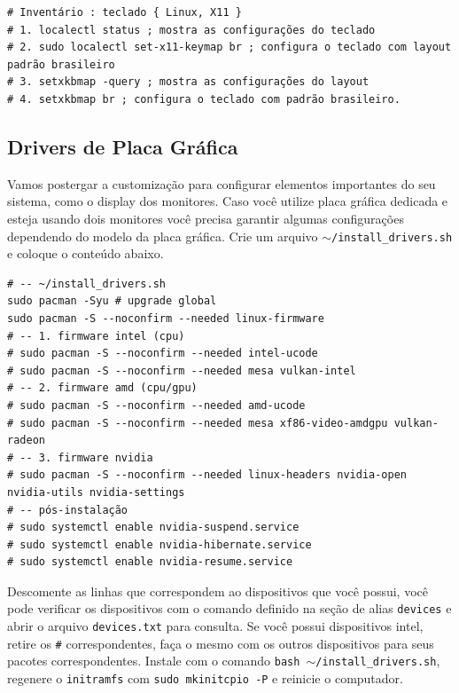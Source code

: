 \documentclass[12pt,a4paper]{article}
\begin{document}
\begin{lstlisting}
# Inventário : teclado { Linux, X11 }
# 1. localectl status ; mostra as configurações do teclado 
# 2. sudo localectl set-x11-keymap br ; configura o teclado com layout padrão brasileiro 
# 3. setxkbmap -query ; mostra as configurações do layout
# 4. setxkbmap br ; configura o teclado com padrão brasileiro.
\end{lstlisting}

\subsection{Drivers de Placa Gráfica}

\hspace{\baselineskip}

Vamos postergar a customização para configurar elementos importantes do seu sistema, como o display dos monitores. Caso você utilize placa gráfica dedicada e esteja usando dois monitores você precisa garantir algumas configurações dependendo do modelo da placa gráfica. Crie um arquivo \texttt{$\sim$/install\_drivers.sh} e coloque o conteúdo abaixo. \\

\begin{lstlisting}
# -- ~/install_drivers.sh
sudo pacman -Syu # upgrade global 
sudo pacman -S --noconfirm --needed linux-firmware 
# -- 1. firmware intel (cpu)
# sudo pacman -S --noconfirm --needed intel-ucode
# sudo pacman -S --noconfirm --needed mesa vulkan-intel
# -- 2. firmware amd (cpu/gpu)
# sudo pacman -S --noconfirm --needed amd-ucode
# sudo pacman -S --noconfirm --needed mesa xf86-video-amdgpu vulkan-radeon
# -- 3. firmware nvidia 
# sudo pacman -S --noconfirm --needed linux-headers nvidia-open nvidia-utils nvidia-settings
# -- pós-instalação 
# sudo systemctl enable nvidia-suspend.service
# sudo systemctl enable nvidia-hibernate.service
# sudo systemctl enable nvidia-resume.service 
\end{lstlisting}

\vspace{\baselineskip}

Descomente as linhas que correspondem ao dispositivos que você possui, você pode verificar os dispositivos com o comando definido na seção de alias \texttt{devices} e abrir o arquivo \texttt{devices.txt} para consulta. Se você possui dispositivos intel, retire os \texttt{\#} correspondentes, faça o mesmo com os outros dispositivos para seus pacotes correspondentes. Instale com o comando \texttt{bash $\sim$/install\_drivers.sh}, regenere o \texttt{initramfs} com \texttt{sudo mkinitcpio -P} e reinicie o computador.
\end{document}
